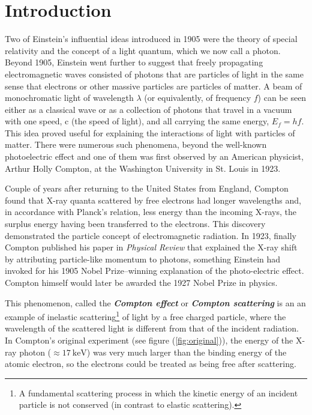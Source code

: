 \documentclass[%
 reprint,
nofootinbib,
 amsmath,amssymb,
 aps,
floatfix,
]{revtex4-2}
\begin{document}
\section{\label{sec:level1}Introduction}
    Two of Einstein’s influential ideas introduced in 1905 were the theory of special relativity and the concept of a light quantum, which we now call a photon. Beyond 1905, Einstein went further to suggest that freely propagating electromagnetic waves consisted of photons that are particles of light in the same sense that electrons or other massive particles are particles of matter. A beam of monochromatic light of wavelength $\lambda$ (or equivalently, of frequency $f$) can be seen either as a classical wave or as a collection of photons that travel in a vacuum with one speed, c (the speed of light), and all carrying the same energy, $E_f = hf$. This idea proved useful for explaining the interactions of light with particles of matter. There were numerous such phenomena, beyond the well-known photoelectric effect and one of them was first observed by an American physicist, Arthur Holly Compton, at the Washington University in St. Louis in 1923.
    \par
    Couple of years after returning to the United States from England, Compton found that X-ray quanta scattered by free electrons had longer wavelengths and, in accordance with Planck's relation, less energy than the incoming X-rays, the surplus energy having been transferred to the electrons. This discovery demonstrated the particle concept of electromagnetic radiation. In 1923, finally Compton published his paper in \textit{Physical Review} that explained the X-ray shift by attributing particle-like momentum to photons, something Einstein had invoked for his 1905 Nobel Prize–winning explanation of the photo-electric effect. Compton himself would later be awarded the 1927 Nobel Prize in physics.
    \par
    This phenomenon, called the \textbf{\textit{Compton effect}} or \textbf{\textit{Compton scattering}} is an an example of inelastic scattering\footnote{A fundamental scattering process in which the kinetic energy of an incident particle is not conserved (in contrast to elastic scattering).} of light by a free charged particle, where the wavelength of the scattered light is different from that of the incident radiation. In Compton's original experiment (see figure (\ref{fig:original})), the energy of the X-ray photon ($\approx \SI{17}{\kilo \electronvolt}$) was very much larger than the binding energy of the atomic electron, so the electrons could be treated as being free after scattering.
\end{document}
